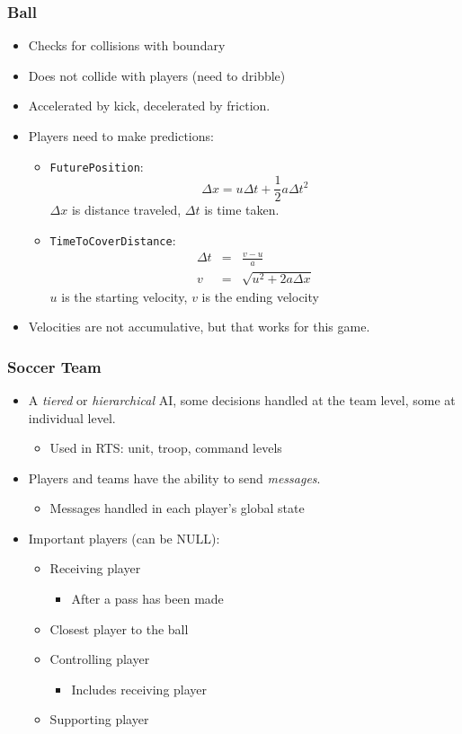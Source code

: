 \documentclass[handout,t,compress]{beamer}
\newcommand{\bframe}[1]{\begin{frame}[fragile]\frametitle{{#1}}}
\newcommand{\bi}{\begin{itemize}}
\newcommand{\li}{\item}
\newcommand{\ei}{\end{itemize}}
\begin{document}
\bframe{Ball}
\begin{itemize}
\item Checks for collisions with boundary
\item Does not collide with players (need to dribble)
\item Accelerated by kick, decelerated by friction. 
\item Players need to make predictions:
\begin{itemize}
\item {\tt FuturePosition}:
\[
\Delta x = u\Delta t + \frac{1}{2}a\Delta t^2
\]
 $\Delta x$ is
  distance traveled, $\Delta t$ is time taken.
\item {\tt TimeToCoverDistance}:
\begin{eqnarray*}
\Delta t &=& \frac{v-u}{a}\\
v &=& \sqrt{u^2 + 2a\Delta x}
\end{eqnarray*}
$u$ is the starting velocity, $v$ is the ending velocity
\end{itemize}
\item Velocities are not accumulative, but that works for this game.
\end{itemize}

\end{frame}

\bframe{Soccer Team}
\begin{itemize}
\item A {\em tiered} or {\em hierarchical} AI, some decisions handled
  at the team level, some at individual level.
\begin{itemize}
\item Used in RTS: unit, troop, command levels
\end{itemize}
\item Players and teams have the ability to send {\em messages}.
\bi\li Messages handled in each player's global state\ei
\item Important players (can be NULL):
\begin{itemize}
\item Receiving player
\bi\li After a pass has been made\ei
\item Closest player to the ball
\item Controlling player
\bi\li Includes receiving player\ei
\item Supporting player
\end{itemize}
\end{itemize}
\end{frame}
\end{document}

